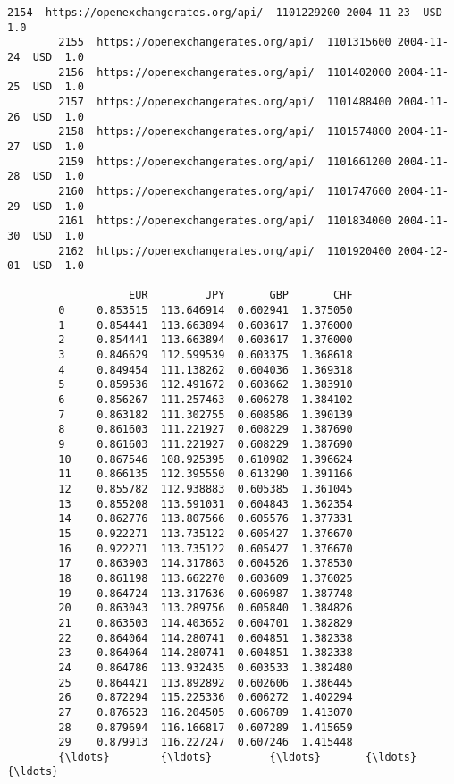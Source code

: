 \documentclass[11pt]{article}
\begin{document}
\begin{Verbatim}[commandchars=\\\{\}]
        2154  https://openexchangerates.org/api/  1101229200 2004-11-23  USD  1.0   
        2155  https://openexchangerates.org/api/  1101315600 2004-11-24  USD  1.0   
        2156  https://openexchangerates.org/api/  1101402000 2004-11-25  USD  1.0   
        2157  https://openexchangerates.org/api/  1101488400 2004-11-26  USD  1.0   
        2158  https://openexchangerates.org/api/  1101574800 2004-11-27  USD  1.0   
        2159  https://openexchangerates.org/api/  1101661200 2004-11-28  USD  1.0   
        2160  https://openexchangerates.org/api/  1101747600 2004-11-29  USD  1.0   
        2161  https://openexchangerates.org/api/  1101834000 2004-11-30  USD  1.0   
        2162  https://openexchangerates.org/api/  1101920400 2004-12-01  USD  1.0   
        
                   EUR         JPY       GBP       CHF  
        0     0.853515  113.646914  0.602941  1.375050  
        1     0.854441  113.663894  0.603617  1.376000  
        2     0.854441  113.663894  0.603617  1.376000  
        3     0.846629  112.599539  0.603375  1.368618  
        4     0.849454  111.138262  0.604036  1.369318  
        5     0.859536  112.491672  0.603662  1.383910  
        6     0.856267  111.257463  0.606278  1.384102  
        7     0.863182  111.302755  0.608586  1.390139  
        8     0.861603  111.221927  0.608229  1.387690  
        9     0.861603  111.221927  0.608229  1.387690  
        10    0.867546  108.925395  0.610982  1.396624  
        11    0.866135  112.395550  0.613290  1.391166  
        12    0.855782  112.938883  0.605385  1.361045  
        13    0.855208  113.591031  0.604843  1.362354  
        14    0.862776  113.807566  0.605576  1.377331  
        15    0.922271  113.735122  0.605427  1.376670  
        16    0.922271  113.735122  0.605427  1.376670  
        17    0.863903  114.317863  0.604526  1.378530  
        18    0.861198  113.662270  0.603609  1.376025  
        19    0.864724  113.317636  0.606987  1.387748  
        20    0.863043  113.289756  0.605840  1.384826  
        21    0.863503  114.403652  0.604701  1.382829  
        22    0.864064  114.280741  0.604851  1.382338  
        23    0.864064  114.280741  0.604851  1.382338  
        24    0.864786  113.932435  0.603533  1.382480  
        25    0.864421  113.892892  0.602606  1.386445  
        26    0.872294  115.225336  0.606272  1.402294  
        27    0.876523  116.204505  0.606789  1.413070  
        28    0.879694  116.166817  0.607289  1.415659  
        29    0.879913  116.227247  0.607246  1.415448  
        {\ldots}        {\ldots}         {\ldots}       {\ldots}       {\ldots}  

\end{Verbatim}
\end{document}
